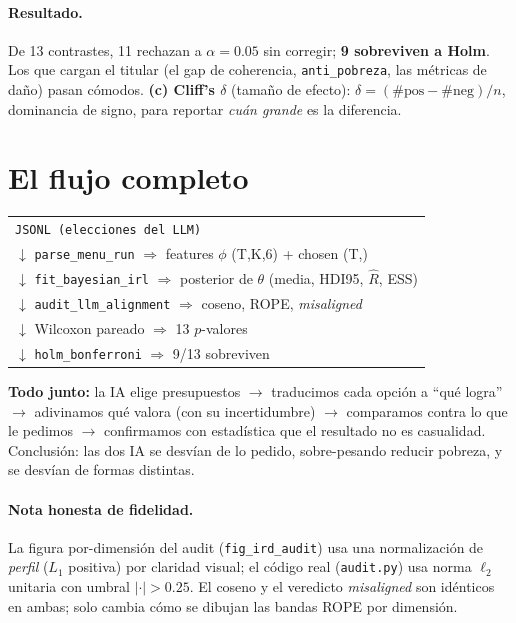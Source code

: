 \documentclass[11pt]{article}
\begin{document}
\paragraph{Resultado.} De 13 contrastes, 11 rechazan a $\alpha{=}0.05$ sin
corregir; \textbf{9 sobreviven a Holm}. Los que cargan el titular (el gap de
coherencia, \texttt{anti\_pobreza}, las m\'etricas de da\~no) pasan c\'omodos.
\textbf{(c) Cliff's $\delta$} (tama\~no de efecto): $\delta=(\#\text{pos}-\#\text{neg})/n$,
dominancia de signo, para reportar \emph{cu\'an grande} es la diferencia.

\section{El flujo completo}
\begin{center}\small
\begin{tabular}{l}
\texttt{JSONL (elecciones del LLM)}\\
\quad$\downarrow$ \texttt{parse\_menu\_run} $\Rightarrow$ features $\phi$ (T,K,6) + chosen (T,)\\
\qquad$\downarrow$ \texttt{fit\_bayesian\_irl} $\Rightarrow$ posterior de $\theta$ (media, HDI95, $\hat R$, ESS)\\
\qquad\quad$\downarrow$ \texttt{audit\_llm\_alignment} $\Rightarrow$ coseno, ROPE, \emph{misaligned}\\
\qquad\quad$\downarrow$ Wilcoxon pareado $\Rightarrow$ 13 $p$-valores\\
\qquad\quad$\downarrow$ \texttt{holm\_bonferroni} $\Rightarrow$ 9/13 sobreviven\\
\end{tabular}
\end{center}

\begin{intu}
\textbf{Todo junto:} la IA elige presupuestos $\to$ traducimos cada opci\'on a
``qu\'e logra'' $\to$ adivinamos qu\'e valora (con su incertidumbre) $\to$
comparamos contra lo que le pedimos $\to$ confirmamos con estad\'istica que el
resultado no es casualidad. Conclusi\'on: las dos IA se desv\'ian de lo pedido,
sobre-pesando reducir pobreza, y se desv\'ian de formas distintas.
\end{intu}

\paragraph{Nota honesta de fidelidad.} La figura por-dimensi\'on del audit
(\texttt{fig\_ird\_audit}) usa una normalizaci\'on de \emph{perfil}
($L_1$ positiva) por claridad visual; el c\'odigo real (\texttt{audit.py})
usa norma $\ell_2$ unitaria con umbral $|{\cdot}|>0.25$. El coseno y el
veredicto \emph{misaligned} son id\'enticos en ambas; solo cambia c\'omo se
dibujan las bandas ROPE por dimensi\'on.
\end{document}

